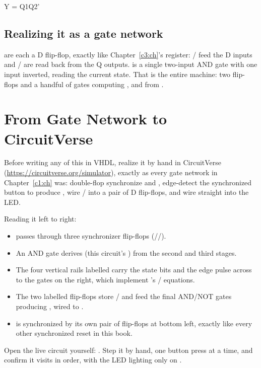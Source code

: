 \begin{console}
Y = Q1Q2'
\end{console}

\subsection{Realizing it as a gate network}
\label{c8:gates}
 are each a D flip-flop, exactly like Chapter~\ref{c3:ch}'s register:
/ feed the D inputs and / are read back from the Q outputs.
 is a single two-input AND gate with one input inverted, reading the current state. That is
the entire machine: two flip-flops and a handful of gates computing ,  and
 from .

\section{From Gate Network to CircuitVerse}
\label{c8:a3}
Before writing any of this in VHDL, realize it by hand in CircuitVerse
(\url{https://circuitverse.org/simulator}), exactly as every gate network in Chapter~\ref{c1:ch}
was: double-flop synchronize  and , edge-detect the synchronized button
to produce , wire / into a pair of D flip-flops, and wire 
straight into the LED.


\noindent Reading it left to right:
\begin{itemize}
  \item {} passes through three synchronizer flip-flops
    (/\allowbreak{}/\allowbreak{}).
  \item An AND gate derives  (this circuit's ) from the second and
    third stages.
  \item The four vertical rails labelled  carry the state bits and the edge pulse
    across to the gates on the right, which implement 's /
    equations.
  \item The two labelled flip-flops store / and feed the final AND/NOT gates
    producing , wired to .
  \item {} is synchronized by its own pair of flip-flops at bottom left, exactly like
    every other synchronized reset in this book.
\end{itemize}
Open the live circuit yourself: . Step it by
hand, one button press at a time, and confirm it visits  in order, with the LED lighting only on .

